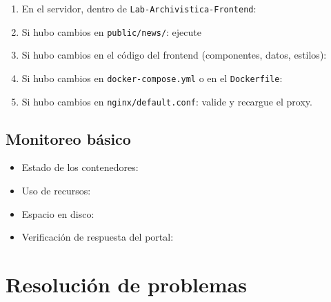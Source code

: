 \documentclass[12pt,a4paper]{report}
\begin{document}
\begin{enumerate}
  \item En el servidor, dentro de \texttt{Lab-Archivistica-Frontend}:
  \item Si hubo cambios en \texttt{public/news/}: ejecute
  \item Si hubo cambios en el código del frontend (componentes, datos,
        estilos): 
  \item Si hubo cambios en \texttt{docker-compose.yml} o en el
        \texttt{Dockerfile}: 
  \item Si hubo cambios en \texttt{nginx/default.conf}: valide y recargue el
        proxy.
\end{enumerate}

\section{Monitoreo básico}

\begin{itemize}
  \item Estado de los contenedores: 
  \item Uso de recursos: 
  \item Espacio en disco: 
  \item Verificación de respuesta del portal: 
\end{itemize}

\chapter{Resolución de problemas}
\end{document}

